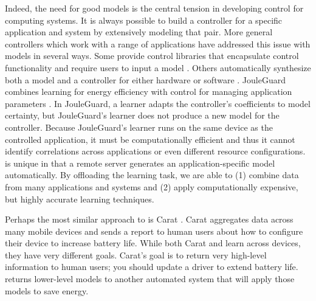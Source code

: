 Indeed, the need for good models is the central tension in developing
control for computing systems.  It is always possible to build a
controller for a specific application and system by extensively
modeling that pair.  More general controllers which work with a range
of applications have addressed this issue with models in several ways.
Some provide control libraries that encapsulate control
functionality and require users to input a model
\cite{ControlWare,Sojka,Rajkumar,POET}.  Others
automatically synthesize both a model and a controller for either
hardware \cite{josep-isca2016} or software \cite{ICSE2014,FSE2015}.
JouleGuard combines learning for energy efficiency with control for
managing application parameters \cite{JouleGuard}.  In JouleGuard, a
learner adapts the controller's coefficients to model certainty, but
JouleGuard's learner does not produce a new model for the controller.
Because JouleGuard's learner runs on the same device as the controlled
application, it must be computationally efficient and thus it cannot
identify correlations across applications or even different resource
configurations.  \SYSTEM{} is unique in that a remote server generates
an application-specific model automatically.  By offloading the
learning task, we are able to (1) combine data from many applications
and systems and (2) apply computationally expensive, but highly accurate
learning techniques.

Perhaps the most similar approach to \SYSTEM{} is Carat \cite{carat}.
Carat aggregates data across many mobile devices and sends a report to
human users about how to configure their device to increase battery
life.  While both Carat and \SYSTEM{} learn across devices, they have
very different goals.  Carat's goal is to return very high-level
information to human users; \eg{} you should update a driver to extend
battery life.  \SYSTEM{} returns lower-level models to another
automated system that will apply those models to save energy.

